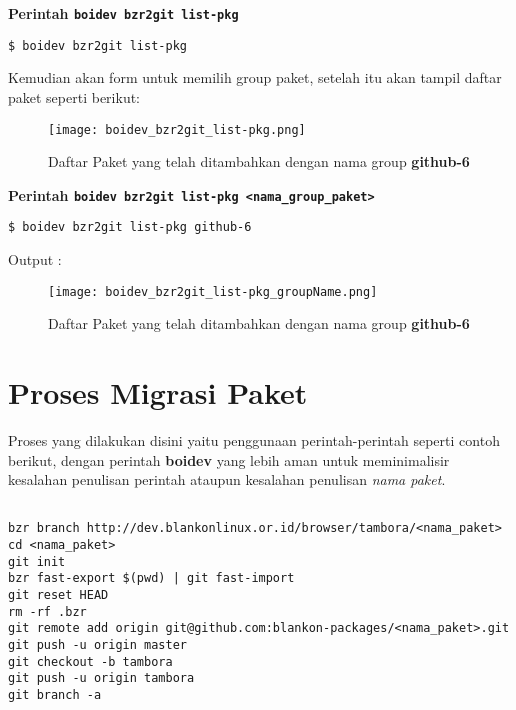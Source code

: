{\noindent
\textbf{Perintah {\small \texttt{boidev bzr2git list-pkg}}}

\begin{lstlisting}[language=ShellBash]
$ boidev bzr2git list-pkg
\end{lstlisting}

\noindent
Kemudian akan form untuk memilih group paket, setelah itu akan tampil daftar paket seperti berikut:

\begin{figure}[H]
	\centering
	\texttt{[image: boidev\_bzr2git\_list-pkg.png]}
	\caption{Daftar Paket yang telah ditambahkan dengan nama group \textbf{github-6}}
	\label{fig:bab2_list-pkg}
\end{figure}

\noindent
\textbf{Perintah {\small \texttt{boidev bzr2git list-pkg <nama\_group\_paket>}}}

\begin{lstlisting}[language=ShellBash]
$ boidev bzr2git list-pkg github-6
\end{lstlisting}

\noindent
Output :
\begin{figure}[H]
	\centering
	\texttt{[image: boidev\_bzr2git\_list-pkg\_groupName.png]}
	\caption{Daftar Paket yang telah ditambahkan dengan nama group \textbf{github-6}}
	\label{fig:bab2_list-pkg_bygrp}
\end{figure}

\section{Proses Migrasi Paket}
\label{sec:pre_impl_pros_mig}
\noindent
Proses yang dilakukan disini yaitu penggunaan perintah-perintah seperti contoh berikut, dengan perintah \textbf{boidev} yang lebih aman untuk meminimalisir kesalahan penulisan perintah ataupun kesalahan penulisan \textit{nama paket}.

\begin{lstlisting}[language=ShellBash2, caption=Perintah Migrasi, label=lst:migrasi_manual]

bzr branch http://dev.blankonlinux.or.id/browser/tambora/<nama_paket>
cd <nama_paket>
git init
bzr fast-export $(pwd) | git fast-import
git reset HEAD
rm -rf .bzr
git remote add origin git@github.com:blankon-packages/<nama_paket>.git
git push -u origin master
git checkout -b tambora
git push -u origin tambora
git branch -a
\end{lstlisting}

}
